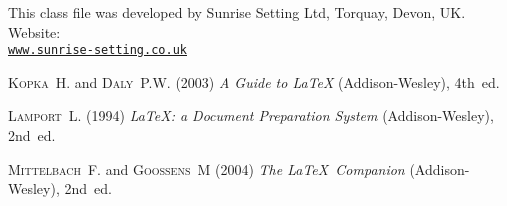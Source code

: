 \documentclass[fonts]{icst}
\begin{document}
\ack This class file was developed by Sunrise Setting Ltd,
Torquay, Devon, UK. Website:\\
\href{http://www.sunrise-setting.co.uk}{\texttt{www.sunrise-setting.co.uk}}

\begin{thebibliography}{9}

 \textsc{Kopka~H.} and \textsc{Daly~P.W.} (2003) \emph{A Guide to \LaTeX}
(Addison-Wesley), 4th~ed.

 \textsc{Lamport~L.} (1994) \emph{\LaTeX: a Document Preparation System}
(Addison-Wesley), 2nd~ed.

 \textsc{Mittelbach~F.} and \textsc{Goossens~M} (2004) \emph{The \LaTeX\ Companion} (Addison-Wesley), 2nd~ed.
\end{thebibliography}
\end{document}
